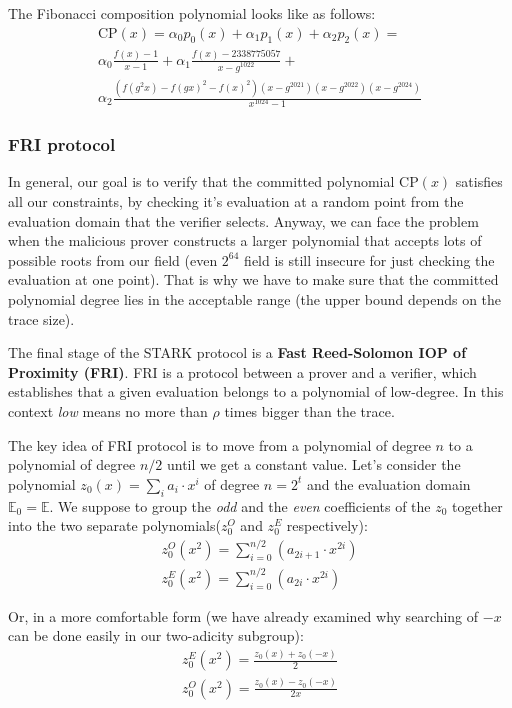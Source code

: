 \documentclass[../lecture-notes.tex]{subfiles}
\begin{document}
\begin{example}
The Fibonacci composition polynomial looks like as follows:
\begin{gather*}
    \text{CP}(x) = \alpha_0 p_0(x) + \alpha_1 p_1(x) + \alpha_2 p_2(x) =\\
    \alpha_0 \frac{f(x)-1}{x - 1} + \alpha_1 \frac{f(x) - 2338775057}{x - g^{1022}} + \\
    \alpha_2 \frac{(f(g^2x) - f(gx)^2 - f(x)^2)(x - g^{2021})(x - g^{2022})(x - g^{2024})}{x^{1024} - 1}
\end{gather*}
\end{example}

\subsubsection{FRI protocol}
In general, our goal is to verify that the committed polynomial $\text{CP}(x)$
satisfies all our constraints, by checking it's evaluation at a random point
from the evaluation domain that the verifier selects. Anyway, we can face the
problem when the malicious prover constructs a larger polynomial that accepts
lots of possible roots from our field (even $2^{64}$ field is still insecure for
just checking the evaluation at one point). That is why we have to make sure
that the committed polynomial degree lies in the acceptable range (the upper
bound depends on the trace size).

The final stage of the STARK protocol is a \textbf{Fast Reed-Solomon IOP of Proximity (FRI)}. FRI is a protocol between a prover and a verifier, which establishes that a given evaluation belongs to a polynomial of low-degree. In this context \textit{low} means no more than $\rho$ times bigger than the trace.

The key idea of FRI protocol is to move from a polynomial of degree $n$ to a
polynomial of degree $n/2$ until we get a constant value. Let's consider the
polynomial $z_0(x) = \sum_i a_i\cdot x^i$ of degree $n=2^t$ and the evaluation
domain $\mathbb{E}_0 = \mathbb{E}$. We suppose to group the \textit{odd} and the
\textit{even} coefficients of the $z_0$ together into the two separate
polynomials($z_0^O$ and $z_0^E$ respectively):
\begin{gather*}
    z_0^O(x^2) = \sum_{i=0}^{n/2} (a_{2i+1}\cdot x^{2i})\\
    z_0^E(x^2) = \sum_{i=0}^{n/2} (a_{2i}\cdot x^{2i})
\end{gather*}

Or, in a more comfortable form (we have already examined why searching of $-x$
can be done easily in our two-adicity subgroup):
\begin{gather*}
    z_0^E(x^2) = \frac{z_0(x) + z_0(-x)}{2}\\
    z_0^O(x^2) = \frac{z_0(x) - z_0(-x)}{2x}
\end{gather*}
\end{document}
